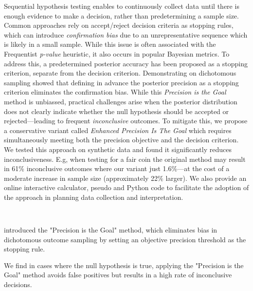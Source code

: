 Sequential hypothesis testing enables to continuously collect data until there is enough
evidence to make a decision, rather than predetermining a sample
size.
Common approaches rely on accept/reject decision criteria as stopping rules,
which can introduce {\it confirmation bias} due to an unrepresentative sequence which is
likely in a small sample.
While this issue is often associated with the Frequentist {\it p-value} heuristic,
it also occurs in popular Bayesian metrics.
To address this, a predetermined posterior accuracy has been proposed
as a stopping criterion, separate from the decision criterion.
Demonstrating on dichotomous sampling \cite{kruschke2015doing} showed that
defining in advance the
posterior precision as a stopping criterion eliminates the confirmation bias.
While this {\it Precision is the Goal} method is unbiassed,
practical challenges arise when the posterior distribution does not clearly indicate
whether the null hypothesis should be accepted or rejected—leading to frequent {\it inconclusive}
outcomes.
To mitigate this, we propose a conservative variant called
{\it Enhanced Precision Is The Goal} which requires simultaneously meeting both the
precision objective and the decision criterion.
We tested this approach on synthetic data and found it significantly reduces
inconclusiveness. E.g, when testing for a fair coin the original method may result in 61\%
inconclusive outcomes where our variant just 1.6\%—at the cost of a moderate increase in sample
size (approximately 22\% larger).
We also provide an online interactive calculator, pseudo and Python code to facilitate the adoption of the
approach in planning data collection and interpretation.


\
\

\cite{kruschke2015doing} introduced the "Precision is the Goal" method,
which eliminates bias in dichotomous outcome sampling by setting an objective precision threshold as the stopping rule.

We find in cases where the null hypothesis is true,
applying the "Precision is the Goal" method avoids false positives but results in a high rate of inconclusive decisions.


\
\


